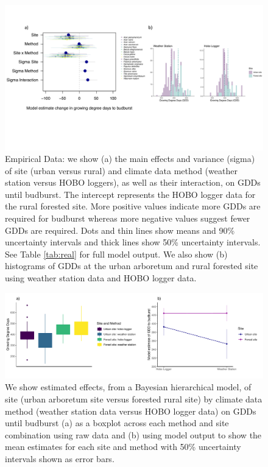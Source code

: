 \documentclass{article}\usepackage[]{graphicx}\usepackage[]{color}
\begin{document}
\begin{figure}[H]
    \centering
    \includegraphics[width=16cm, trim=0cm 5cm 0cm 0cm,]{..//analyses/figures/muandgdd.pdf}
\caption{ Empirical Data: we show (a) the main effects and variance (sigma) of site (urban versus rural) and climate data method (weather station versus HOBO loggers), as well as their interaction, on GDDs until budburst. The intercept represents the HOBO logger data for the rural forested site. More positive values indicate more GDDs are required for budburst whereas more negative values suggest fewer GDDs are required. Dots and thin lines show means and 90\% uncertainty intervals and thick lines show 50\% uncertainty intervals. See Table \ref{tab:real} for full model output. We also show (b) histograms of GDDs at the urban arboretum and rural forested site using weather station data and HOBO logger data.}
\label{fig:real}
\end{figure}

\begin{figure}[H]
      \centering
      \includegraphics[width=16cm]{..//analyses/figures/gdd_interaction.pdf} 
\caption{ We show estimated effects, from a Bayesian hierarchical model, of site (urban arboretum site versus forested rural site) by climate data method (weather station data versus HOBO logger data) on GDDs until budburst (a) as a boxplot across each method and site combination using raw data and (b) using model output to show the mean estimates for each site and method with 50\% uncertainty intervals shown as error bars.}
\label{fig:interaction}
\end{figure}



  
  
\end{document}
